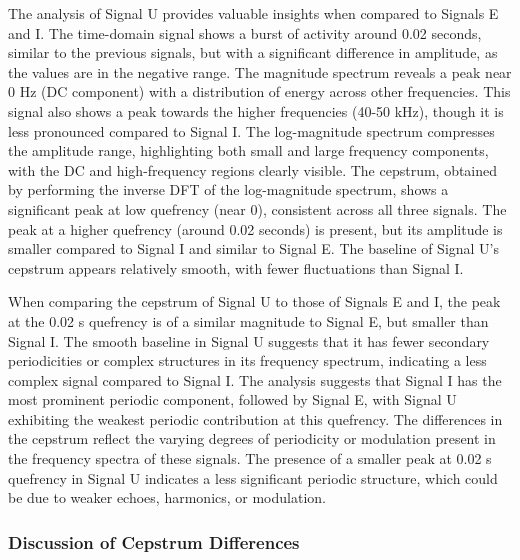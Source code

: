 \documentclass[a4paper,12pt]{article}
\begin{document}
The analysis of Signal U provides valuable insights when compared to Signals E and I. The time-domain signal shows a burst of activity around 0.02 seconds, similar to the previous signals, but with a significant difference in amplitude, as the values are in the negative range. The magnitude spectrum reveals a peak near 0 Hz (DC component) with a distribution of energy across other frequencies. This signal also shows a peak towards the higher frequencies (40-50 kHz), though it is less pronounced compared to Signal I. The log-magnitude spectrum compresses the amplitude range, highlighting both small and large frequency components, with the DC and high-frequency regions clearly visible. The cepstrum, obtained by performing the inverse DFT of the log-magnitude spectrum, shows a significant peak at low quefrency (near 0), consistent across all three signals. The peak at a higher quefrency (around 0.02 seconds) is present, but its amplitude is smaller compared to Signal I and similar to Signal E. The baseline of Signal U's cepstrum appears relatively smooth, with fewer fluctuations than Signal I. 

When comparing the cepstrum of Signal U to those of Signals E and I, the peak at the 0.02 s quefrency is of a similar magnitude to Signal E, but smaller than Signal I. The smooth baseline in Signal U suggests that it has fewer secondary periodicities or complex structures in its frequency spectrum, indicating a less complex signal compared to Signal I. The analysis suggests that Signal I has the most prominent periodic component, followed by Signal E, with Signal U exhibiting the weakest periodic contribution at this quefrency. The differences in the cepstrum reflect the varying degrees of periodicity or modulation present in the frequency spectra of these signals. The presence of a smaller peak at 0.02 s quefrency in Signal U indicates a less significant periodic structure, which could be due to weaker echoes, harmonics, or modulation. 
\subsubsection{Discussion of Cepstrum Differences}
\end{document}
